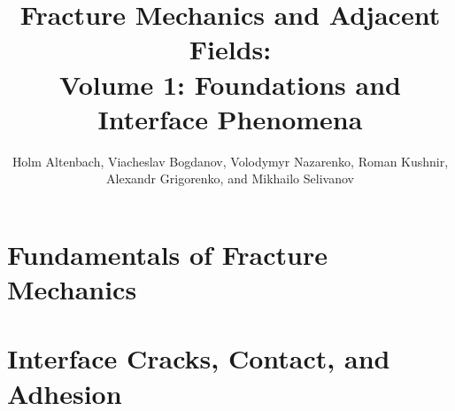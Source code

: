 \documentclass[graybox]{svmult}
\numberwithin{equation}{chapter}
\begin{document}
	
	\title*{Fracture Mechanics and Adjacent Fields:\\
		Volume 1: Foundations and Interface Phenomena}
	
	
	\author{Holm Altenbach,
		Viacheslav Bogdanov,
		Volodymyr Nazarenko,
		Roman Kushnir,
		Alexandr Grigorenko,
		and
		Mikhailo Selivanov}
	
	\maketitle
	
	
	
	\setcounter{tocdepth}{2}
	\tableofcontents
	
	
	
	\part{Fundamentals of Fracture Mechanics}
	
	
	
	
	
	
	
	
	
	\part{Interface Cracks, Contact, and Adhesion}
	
	
	
	
	
	
	
	
	
	
	\backmatter
	\printindex
	
\end{document}
